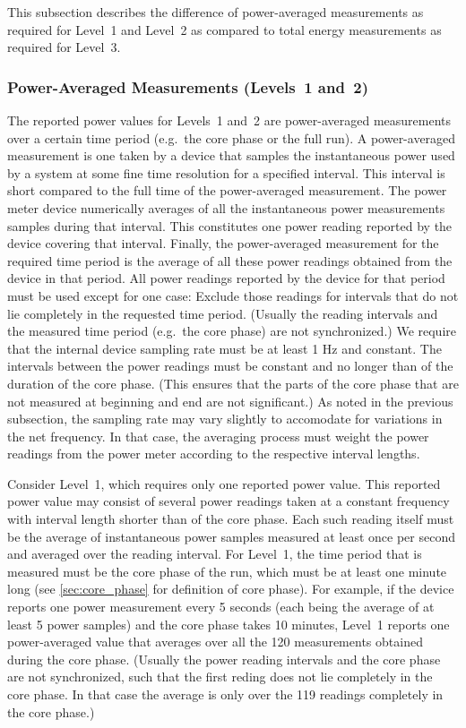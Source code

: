 This subsection describes the difference of power-averaged measurements as required for Level~1 and Level~2 as compared to total energy measurements as required for Level~3.

\subsubsection{Power-Averaged Measurements (Levels~1 and~2)}

\noindent
The reported power values for Levels~1 and~2 are power-averaged measurements over a certain time period (e.g.~the core phase or the full run).
A power-averaged measurement is one taken by a device that samples the instantaneous power used by a system at some fine time resolution for a specified interval.
This interval is short compared to the full time of the power-averaged measurement.
The power meter device numerically averages of all the instantaneous power measurements samples during that interval.
This constitutes one power reading reported by the device covering that interval.
Finally, the power-averaged measurement for the required time period is the average of all these power readings obtained from the device in that period.
All power readings reported by the device for that period must be used except for one case:
Exclude those readings for intervals that do not lie completely in the requested time period.
(Usually the reading intervals and the measured time period (e.g.~the core phase) are not synchronized.)
We require that the internal device sampling rate must be at least 1 Hz and constant.
The intervals between the power readings must be constant and no longer than \MaxReadingIntervalCorePhaseLTwoThree{} of the duration of the core phase.
(This ensures that the parts of the core phase that are not measured at beginning and end are not significant.)
As noted in the previous subsection, the sampling rate may vary slightly to accomodate for variations in the net frequency.
In that case, the averaging process must weight the power readings from the power meter according to the respective interval lengths.
\wl

\noindent
Consider Level~1, which requires only one reported power value.
This reported power value may consist of several power readings taken at a constant frequency with interval length shorter than \MaxReadingIntervalCorePhaseLTwoThree{} of the core phase.
Each such reading itself must be the average of instantaneous power samples measured at least once per second and averaged over the reading interval.
For Level~1, the time period that is measured must be the core phase of the run, which must be at least one minute long (see \ref{sec:core_phase} for definition of core phase).
For example, if the device reports one power measurement every 5 seconds (each being the average of at least 5 power samples) and the core phase takes 10 minutes, Level~1 reports one power-averaged value that averages over all the 120 measurements obtained during the core phase.
(Usually the power reading intervals and the core phase are not synchronized, such that the first reding does not lie completely in the core phase.
In that case the average is only over the 119 readings completely in the core phase.)
\wl

